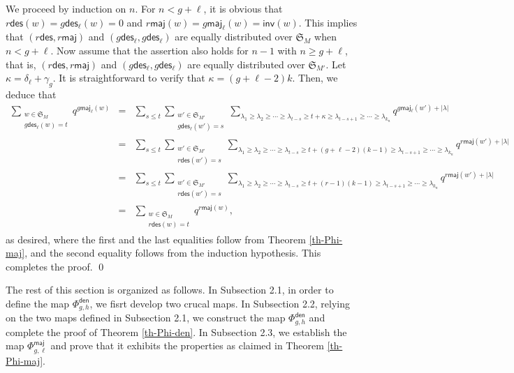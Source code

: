 \documentclass[12pt]{article}
\numberwithin{equation}{section}
\theoremstyle{plain}
\def\des{\mathsf{des}}
\def\maj{\mathsf{maj}}
\def\den{\mathsf{den}}
\def\inv{\mathsf{inv}}
\begin{document}
  
  We  proceed   by induction on $n$.  For $n<g+\ell$, 
  it  is obvious that  
  $r\des(w)=g\des_{\ell}(w)=0$ and $r\maj(w)=g\maj_{\ell}(w)=\inv(w)$. This implies that  $(r\des, r\maj)$ and $(g\des_\ell, g\des_{\ell})$ are equally distributed over $\mathfrak{S}_{M}$ when $n<g+\ell$. 
  Now assume  that the assertion also holds for   $n-1$ with $n\geq g+\ell$, that is,  $(r\des, r\maj)$ and $(g\des_\ell, g\des_{\ell})$ are equally distributed over $\mathfrak{S}_{M'}$.  Let $\kappa=\delta_{\ell}+\gamma_{g}$.  It is straightforward to verify that  $\kappa=(g+\ell-2)k$.   Then,   we deduce that 
  \begin{equation}
  	\begin{array}{lll}
  		\sum\limits_{\substack{w\in \mathfrak{S}_{M}\\
  			g\des_\ell(w)=t}}q^{g\maj_\ell(w)}&=&\sum\limits_{s\leq t} \sum\limits_{\substack{w'\in \mathfrak{S}_{M'}\\
  			g\des_\ell(w')=s}}\sum\limits_{\lambda_1\geq \lambda_2\geq \cdots \geq \lambda_{t-s}\geq t+\kappa \geq \lambda_{t-s+1}\geq \cdots\geq \lambda_{k_n}}q^{g\maj_{\ell}(w')+|\lambda|}\\
  		 [2em]
  		&=&\sum\limits_{s\leq t} \sum\limits_{\substack{w'\in \mathfrak{S}_{M'}\\
  			r\des(w')=s}}\sum\limits_{\lambda_1\geq \lambda_2\geq \cdots \geq \lambda_{t-s}\geq t+(g+\ell-2)(k-1) \geq \lambda_{t-s+1}\geq \cdots\geq \lambda_{k_n}}q^{r\maj(w')+|\lambda|}\\
  		 [2em]
  				&=&\sum\limits_{s\leq t} \sum\limits_{\substack{w'\in \mathfrak{S}_{M'}\\
  					r\des(w')=s}}\sum\limits_{\lambda_1\geq \lambda_2\geq \cdots \geq \lambda_{t-s}\geq t+(r-1)(k-1) \geq \lambda_{t-s+1}\geq \cdots\geq \lambda_{k_n}}q^{r\maj(w')+|\lambda|}\\
  				 [2em]
  				&=&\sum\limits_{\substack{w\in \mathfrak{S}_{M}\\
  						r\des(w)=t}}q^{r\maj(w)},
  		\end{array}
  	 \end{equation}
  as desired, where the first and the last equalities follow from   Theorem \ref{th-Phi-maj}, and the second equality follows from the  induction hypothesis. This completes the proof. 
 \qed
  
 
 The rest of this section is organized as follows.   In Subsection 2.1,  in order to define the map $\Phi^{\den}_{g, h}$, we fisrt develop two crucal maps.  In Subsection 2.2, relying on the two maps defined in Subsection 2.1,  we construct the map $\Phi^{\den}_{g,h}$  and  complete  the proof of Theorem \ref{th-Phi-den}.  In Subsection 2.3, we establish the map $\Phi^{\maj}_{g, \ell}$ and prove that it  exhibits the properties as claimed in Theorem \ref{th-Phi-maj}. 
\end{document}
